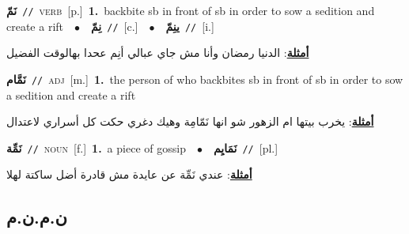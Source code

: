 \documentclass[10pt,a4paper,twoside]{article} %
\begin{document}
\begin{multicols}{2}
{\setlength\topsep{0pt}\textbf{\foreignlanguage{arabic}{نَمّ}}\ {\color{gray}\texttt{//}\color{black}}\ \textsc{verb}\ [p.]\ \textbf{1.}~backbite sb in front of sb in order to sow a sedition and create a rift\ \ $\bullet$\ \ \setlength\topsep{0pt}\textbf{\foreignlanguage{arabic}{نِمّ}}\ {\color{gray}\texttt{//}\color{black}}\ [c.]\ \ $\bullet$\ \ \setlength\topsep{0pt}\textbf{\foreignlanguage{arabic}{ينِمّ}}\ {\color{gray}\texttt{//}\color{black}}\ [i.]\  \begin{flushright}\color{gray}\foreignlanguage{arabic}{\textbf{\underline{\foreignlanguage{arabic}{أمثلة}}}: الدنيا رمضان وأنا مش جاي عبالي أنِم عحدا بهالوقت الفضيل}\end{flushright}\color{black}} \vspace{2mm}

{\setlength\topsep{0pt}\textbf{\foreignlanguage{arabic}{نَمَّام}}\ {\color{gray}\texttt{//}\color{black}}\ \textsc{adj}\ [m.]\ \textbf{1.}~the person of who backbites sb in front of sb in order to sow a sedition and create a rift\  \begin{flushright}\color{gray}\foreignlanguage{arabic}{\textbf{\underline{\foreignlanguage{arabic}{أمثلة}}}: يخرب بيتها ام الزهور شو انها نَمّامِة وهيك دغري حكت كل أسراري لاعتدال}\end{flushright}\color{black}} \vspace{2mm}

{\setlength\topsep{0pt}\textbf{\foreignlanguage{arabic}{نَمِّة}}\ {\color{gray}\texttt{//}\color{black}}\ \textsc{noun}\ [f.]\ \textbf{1.}~a piece of gossip\ \ $\bullet$\ \ \setlength\topsep{0pt}\textbf{\foreignlanguage{arabic}{نَمَايِم}}\ {\color{gray}\texttt{//}\color{black}}\ [pl.]\  \begin{flushright}\color{gray}\foreignlanguage{arabic}{\textbf{\underline{\foreignlanguage{arabic}{أمثلة}}}: عندي نَمِّة عن عايدة مش قادرة أضل ساكتة لهلا}\end{flushright}\color{black}} \vspace{2mm}

\vspace{-3mm}
\subsection*{\color{blue}\foreignlanguage{arabic}{ن.م.ن.م}\color{blue}{}} 


\end{multicols}
\end{document}
